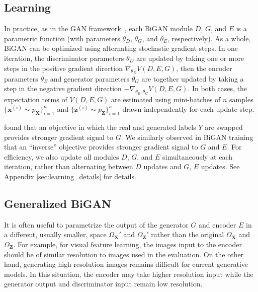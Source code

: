 \documentclass{article}
\renewcommand{\vec}[1]{\mathbf{#1}}
\newcommand{\x}{\vec{x}}
\newcommand{\X}{\vec{X}}
\newcommand{\OX}{\Omega_\X}
\newcommand{\z}{\vec{z}}
\newcommand{\Z}{\vec{Z}}
\newcommand{\OZ}{\Omega_\Z}
\newcommand{\lblsec}[1]{\label{sec:#1}}
\begin{document}
\subsection{Learning}
\lblsec{learning}
In practice, as in the GAN framework~\citep{gan}, each BiGAN module
$D$, $G$, and $E$
is a parametric function
(with parameters
$\theta_D$, $\theta_G$, and $\theta_E$,
respectively).
As a whole, BiGAN can be optimized using alternating stochastic gradient steps.
In one iteration, the discriminator parameters $\theta_D$
are updated by taking one or more steps in the positive gradient direction $
\nabla_{\theta_D}
V(D, E, G)
$, then the encoder parameters $\theta_E$ and generator parameters $\theta_G$
are together updated by taking a step in the negative gradient direction $
-\nabla_{\theta_E,\theta_G}
V(D, E, G)
$.
In both cases, the expectation terms of $V(D, E, G)$ are estimated using mini-batches of $n$ samples $
\{\x^{(i)} \sim p_\X\}_{i=1}^n
$ and $
\{\z^{(i)} \sim p_\Z\}_{i=1}^n
$ drawn independently for each update step.

\citet{gan} found that
an objective in which the real and generated labels $Y$ are swapped
provides stronger gradient signal to $G$.
We similarly observed in BiGAN training that an ``inverse'' objective
provides stronger gradient signal to $G$ and $E$.
For efficiency, we also update all modules $D$, $G$, and $E$ simultaneously at each iteration,
rather than alternating between $D$ updates and $G$, $E$ updates.
See Appendix \ref{sec:learning_details} for details.


\subsection{Generalized BiGAN}
\label{sec:genbigan}
It is often useful to parametrize the output of the generator $G$ and encoder $E$ in a different, usually smaller, space $\OX'$ and $\OZ'$ rather than the original $\OX$ and $\OZ$.
For example, for visual feature learning, the images input to the encoder should be of similar resolution to images used in the evaluation.
On the other hand, generating high resolution images remains difficult for current generative models.
In this situation, the encoder may take higher resolution input while the generator output and discriminator input remain low resolution.
\end{document}
